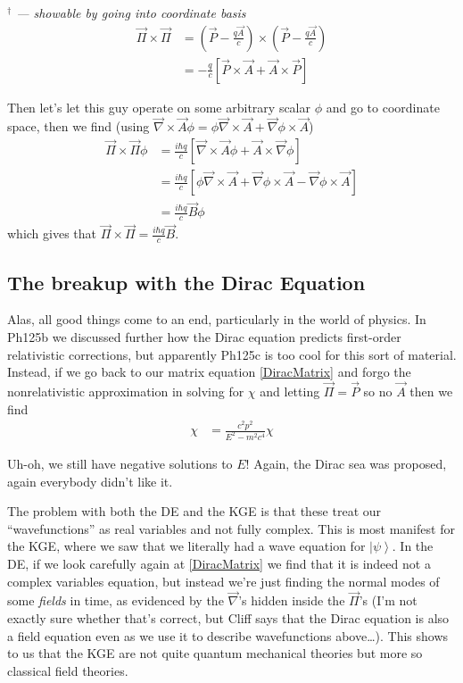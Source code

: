\documentclass[12pt]{article}
\newcommand{\ket}[1]{\left|#1\right>}
\begin{document}
{\em \scriptsize $^\dagger$ --- showable by going into coordinate basis
\begin{align}
    \vec{\Pi} \times \vec{\Pi} &= \left( \vec{P} - \frac{q\vec{A}}{c}  \right) \times \left( \vec{P} - \frac{q\vec{A}}{c}  \right)\\
    &= -\frac{q}{c}\left[ \vec{P} \times \vec{A} + \vec{A} \times \vec{P} \right]
\end{align}

Then let's let this guy operate on some arbitrary scalar $\phi$ and go to coordinate space, then we find (using $\vec{\nabla} \times \vec{A} \phi = \phi \vec{\nabla} \times \vec{A} + \vec{\nabla} \phi \times \vec{A}$)
\begin{align}
    \vec{\Pi} \times \vec{\Pi} \phi &= \frac{i\hbar q}{c}\left[ \vec{\nabla} \times \vec{A}\phi + \vec{A} \times \vec{\nabla}\phi \right]\\
    &= \frac{i\hbar q}{c}\left[ \phi \vec{\nabla} \times \vec{A} + \vec{\nabla}\phi \times \vec{A} - \vec{\nabla}\phi\times \vec{A}  \right]\\
    &=\frac{i\hbar q}{c} \vec{B}\phi
\end{align}
which gives that $\vec{\Pi} \times \vec{\Pi} = \frac{i\hbar q}{c}\vec{B}$.
}

\subsection{The breakup with the Dirac Equation}

Alas, all good things come to an end, particularly in the world of physics. In Ph125b we discussed further how the Dirac equation predicts first-order relativistic corrections, but apparently Ph125c is too cool for this sort of material. Instead, if we go back to our matrix equation \eqref{DiracMatrix} and forgo the nonrelativistic approximation in solving for $\chi$ and letting $\vec{\Pi} = \vec{P}$ so no $\vec{A}$ then we find
\begin{align}
    \chi &= \frac{c^2p^2}{E^2 - m^2c^4}\chi
\end{align}

Uh-oh, we still have negative solutions to $E$! Again, the Dirac sea was proposed, again everybody didn't like it.

The problem with both the DE and the KGE is that these treat our ``wavefunctions'' as real variables and not fully complex. This is most manifest for the KGE, where we saw that we literally had a wave equation for $\ket{\psi}$. In the DE, if we look carefully again at \eqref{DiracMatrix} we find that it is indeed not a complex variables equation, but instead we're just finding the normal modes of some \emph{fields} in time, as evidenced by the $\vec{\nabla}$'s hidden inside the $\vec{\Pi}$'s (I'm not exactly sure whether that's correct, but Cliff says that the Dirac equation is also a field equation even as we use it to describe wavefunctions above\dots). This shows to us that the KGE are not quite quantum mechanical theories but more so classical field theories.
\end{document}
